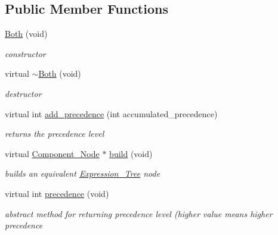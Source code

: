 \subsection*{Public Member Functions}
\begin{DoxyCompactItemize}
\item 
\hyperlink{classMadara_1_1Expression__Tree_1_1Both_a3a551f43047b640520b700c232cc7705}{Both} (void)
\begin{DoxyCompactList}\small\item\em constructor \item\end{DoxyCompactList}\item 
virtual \hyperlink{classMadara_1_1Expression__Tree_1_1Both_a8dff5c9462838b1fcf9ca6aa57afda46}{$\sim$Both} (void)
\begin{DoxyCompactList}\small\item\em destructor \item\end{DoxyCompactList}\item 
virtual int \hyperlink{classMadara_1_1Expression__Tree_1_1Both_addad47fe40cf18e040c951b2020879bd}{add\_\-precedence} (int accumulated\_\-precedence)
\begin{DoxyCompactList}\small\item\em returns the precedence level \item\end{DoxyCompactList}\item 
virtual \hyperlink{classMadara_1_1Expression__Tree_1_1Component__Node}{Component\_\-Node} $\ast$ \hyperlink{classMadara_1_1Expression__Tree_1_1Both_aca16b3e486c63af7c0148cfc16e3b8c5}{build} (void)
\begin{DoxyCompactList}\small\item\em builds an equivalent \hyperlink{classMadara_1_1Expression__Tree_1_1Expression__Tree}{Expression\_\-Tree} node \item\end{DoxyCompactList}\item 
virtual int \hyperlink{classMadara_1_1Expression__Tree_1_1Symbol_ac060dedb8d16864591b259df375109b3}{precedence} (void)
\begin{DoxyCompactList}\small\item\em abstract method for returning precedence level (higher value means higher precedence \item\end{DoxyCompactList}\end{DoxyCompactItemize}
